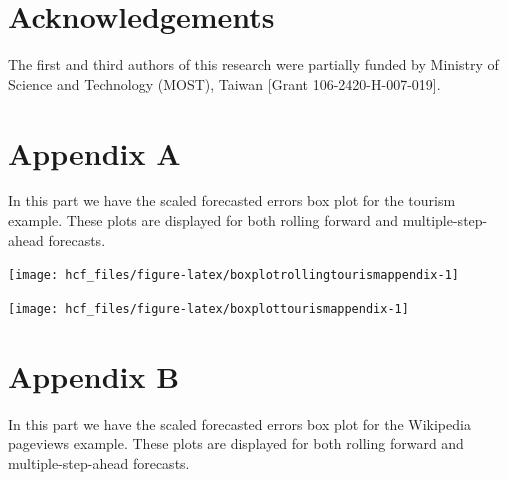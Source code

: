 \documentclass[11pt,a4paper,]{article}
\let\origfigure\figure
\let\endorigfigure\endfigure
\renewenvironment{figure}[1][2] {
    \expandafter\origfigure\expandafter[!htbp]
} {
    \endorigfigure
}
\begin{document}
\hypertarget{acknowledgements}{%
\section*{Acknowledgements}\label{acknowledgements}}

The first and third authors of this research were partially funded by Ministry of Science and Technology (MOST), Taiwan {[}Grant 106-2420-H-007-019{]}.

\clearpage

\hypertarget{appendixA}{%
\section*{Appendix A}\label{appendixA}}

In this part we have the scaled forecasted errors box plot for the tourism example. These plots are displayed for both rolling forward and multiple-step-ahead forecasts.

\begin{figure}

{\centering \texttt{[image: hcf\_files/figure-latex/boxplotrollingtourismappendix-1]} 

}

\caption{Box plots of scaled forecast errors from reconciled and unreconciled ETS, ARIMA and OLS methods at each hierarchical level for 1-step-ahead tourism demand.}\label{fig:boxplotrollingtourismappendix}
\end{figure}

\begin{figure}

{\centering \texttt{[image: hcf\_files/figure-latex/boxplottourismappendix-1]} 

}

\caption{Box plots of scaled forecast errors from reconciled and unreconciled ETS, ARIMA and OLS methods at each hierarchical level for 24-step-ahead tourism demand.}\label{fig:boxplottourismappendix}
\end{figure}

\clearpage

\hypertarget{appendixB}{%
\section*{Appendix B}\label{appendixB}}

In this part we have the scaled forecasted errors box plot for the Wikipedia pageviews example. These plots are displayed for both rolling forward and multiple-step-ahead forecasts.
\end{document}
